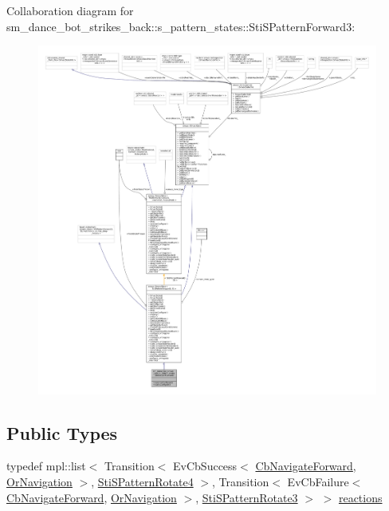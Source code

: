 Collaboration diagram for sm\+\_\+dance\+\_\+bot\+\_\+strikes\+\_\+back\+:\+:s\+\_\+pattern\+\_\+states\+:\+:Sti\+S\+Pattern\+Forward3\+:
\nopagebreak
\begin{figure}[H]
\begin{center}
\leavevmode
\includegraphics[width=350pt]{structsm__dance__bot__strikes__back_1_1s__pattern__states_1_1StiSPatternForward3__coll__graph}
\end{center}
\end{figure}
\subsection*{Public Types}
\begin{DoxyCompactItemize}
\item 
typedef mpl\+::list$<$ Transition$<$ Ev\+Cb\+Success$<$ \hyperlink{classcl__move__base__z_1_1CbNavigateForward}{Cb\+Navigate\+Forward}, \hyperlink{classsm__dance__bot__strikes__back_1_1OrNavigation}{Or\+Navigation} $>$, \hyperlink{structsm__dance__bot__strikes__back_1_1s__pattern__states_1_1StiSPatternRotate4}{Sti\+S\+Pattern\+Rotate4} $>$, Transition$<$ Ev\+Cb\+Failure$<$ \hyperlink{classcl__move__base__z_1_1CbNavigateForward}{Cb\+Navigate\+Forward}, \hyperlink{classsm__dance__bot__strikes__back_1_1OrNavigation}{Or\+Navigation} $>$, \hyperlink{structsm__dance__bot__strikes__back_1_1s__pattern__states_1_1StiSPatternRotate3}{Sti\+S\+Pattern\+Rotate3} $>$ $>$ \hyperlink{structsm__dance__bot__strikes__back_1_1s__pattern__states_1_1StiSPatternForward3_a34498ac898517892b5f26c22785a55d1}{reactions}
\end{DoxyCompactItemize}

